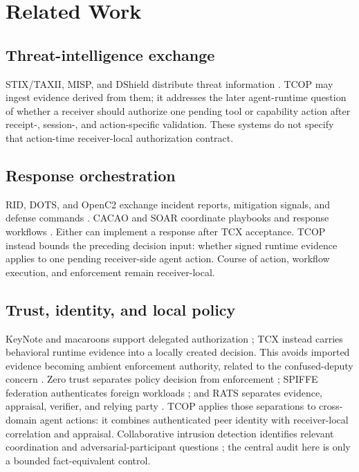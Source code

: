 \section{Related Work}

\subsection{Threat-intelligence exchange}

STIX/TAXII, MISP, and DShield distribute threat information \cite{stix21,taxii21,mispCore,dshieldFeeds}. TCOP may ingest evidence derived from them; it addresses the later agent-runtime question of whether a receiver should authorize one pending tool or capability action after receipt-, session-, and action-specific validation. These systems do not specify that action-time receiver-local authorization contract.

\subsection{Response orchestration}

RID, DOTS, and OpenC2 exchange incident reports, mitigation signals, and defense commands \cite{rid12,dots21,openc2v1}. CACAO and SOAR coordinate playbooks and response workflows \cite{cacao20,bridges23}. Either can implement a response after TCX acceptance. TCOP instead bounds the preceding decision input: whether signed runtime evidence applies to one pending receiver-side agent action. Course of action, workflow execution, and enforcement remain receiver-local.

\subsection{Trust, identity, and local policy}

KeyNote and macaroons support delegated authorization \cite{keynote99,birgisson2014macaroons}; TCX instead carries behavioral runtime evidence into a locally created decision. This avoids imported evidence becoming ambient enforcement authority, related to the confused-deputy concern \cite{hardy88}. Zero trust separates policy decision from enforcement \cite{nistZta}; SPIFFE federation authenticates foreign workloads \cite{spiffeFederation}; and RATS separates evidence, appraisal, verifier, and relying party \cite{rats}. TCOP applies those separations to cross-domain agent actions: it combines authenticated peer identity with receiver-local correlation and appraisal. Collaborative intrusion detection identifies relevant coordination and adversarial-participant questions \cite{bye2010}; the central audit here is only a bounded fact-equivalent control.


